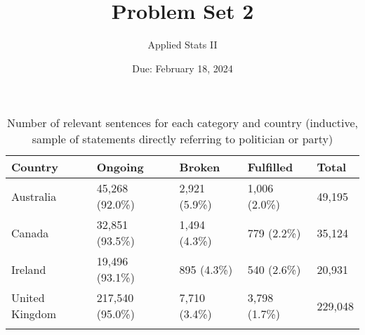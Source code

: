 \documentclass[12pt,letterpaper]{article}
\title{Problem Set 2}
\date{Due: February 18, 2024}
\author{Applied Stats II}
\begin{document}
\begingroup\footnotesize
\begin{longtable}{p{}p{}p{}p{}p{}}
\caption{Number of relevant sentences for each category and country (inductive, sample of statements directly referring to politician or party)} \\ 
  \hline
Country & Ongoing & Broken & Fulfilled & Total \\ 
  \hline 
\endhead 
\hline 
\endfoot 
\endlastfoot 
Australia & 45,268 (92.0\%) & 2,921 (5.9\%) & 1,006 (2.0\%) & 49,195 \\ 
  Canada & 32,851 (93.5\%) & 1,494 (4.3\%) & 779 (2.2\%) & 35,124 \\ 
  Ireland & 19,496 (93.1\%) & 895 (4.3\%) & 540 (2.6\%) & 20,931 \\ 
  United Kingdom & 217,540 (95.0\%) & 7,710 (3.4\%) & 3,798 (1.7\%) & 229,048 \\ 
  \hline
\label{tab:articles_inductive_partymp}
\end{longtable}
\endgroup
\end{document}
